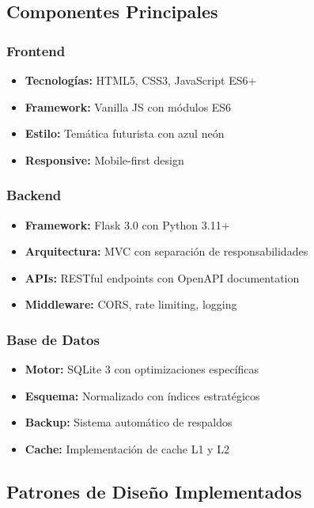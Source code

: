 \documentclass[12pt,a4paper]{article}
\begin{document}
\subsection{Componentes Principales}

\subsubsection{Frontend}
\begin{itemize}
    \item \textbf{Tecnologías:} HTML5, CSS3, JavaScript ES6+
    \item \textbf{Framework:} Vanilla JS con módulos ES6
    \item \textbf{Estilo:} Temática futurista con azul neón
    \item \textbf{Responsive:} Mobile-first design
\end{itemize}

\subsubsection{Backend}
\begin{itemize}
    \item \textbf{Framework:} Flask 3.0 con Python 3.11+
    \item \textbf{Arquitectura:} MVC con separación de responsabilidades
    \item \textbf{APIs:} RESTful endpoints con OpenAPI documentation
    \item \textbf{Middleware:} CORS, rate limiting, logging
\end{itemize}

\subsubsection{Base de Datos}
\begin{itemize}
    \item \textbf{Motor:} SQLite 3 con optimizaciones específicas
    \item \textbf{Esquema:} Normalizado con índices estratégicos
    \item \textbf{Backup:} Sistema automático de respaldos
    \item \textbf{Cache:} Implementación de cache L1 y L2
\end{itemize}

\subsection{Patrones de Diseño Implementados}
\end{document}

